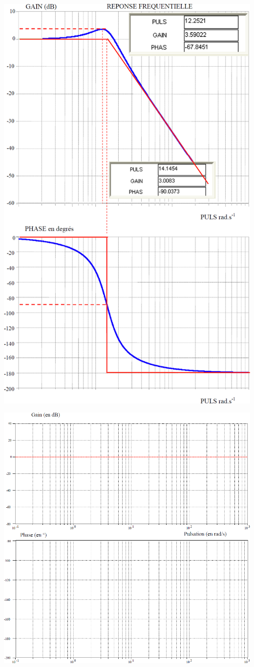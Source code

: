 \documentclass[10pt,fleqn]{article} %
\begin{document}
\begin{center}
\includegraphics[width=\linewidth]{images/fig_03}
\end{center}

\begin{center}
\includegraphics[width=.8\linewidth]{images/fig_04}
\end{center}
\end{document}
